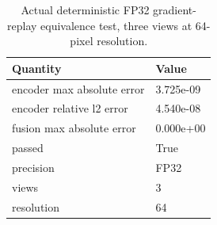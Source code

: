 \begin{table}[!t]
\centering\footnotesize
\caption{Actual deterministic FP32 gradient-replay equivalence test, three views at 64-pixel resolution.}
\label{tab:prelim_replay}
\begin{tabularx}{\columnwidth}{@{}p{27mm}X@{}}
\toprule
Quantity & Value \\
\midrule
encoder max absolute error & 3.725e-09 \\
encoder relative l2 error & 4.540e-08 \\
fusion max absolute error & 0.000e+00 \\
passed & True \\
precision & FP32 \\
views & 3 \\
resolution & 64 \\
\bottomrule
\end{tabularx}
\end{table}